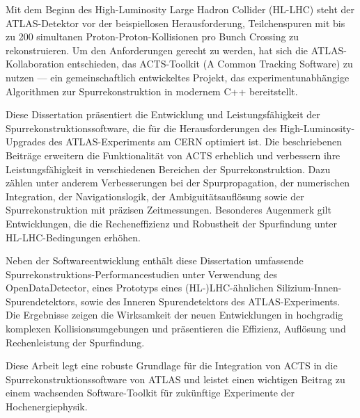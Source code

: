 Mit dem Beginn des High-Luminosity Large Hadron Collider (HL-LHC) steht der ATLAS-Detektor vor der beispiellosen Herausforderung, Teilchenspuren mit bis zu 200 simultanen Proton-Proton-Kollisionen pro Bunch Crossing zu rekonstruieren. Um den Anforderungen gerecht zu werden, hat sich die ATLAS-Kollaboration entschieden, das ACTS-Toolkit (A Common Tracking Software) zu nutzen — ein gemeinschaftlich entwickeltes Projekt, das experimentunabhängige Algorithmen zur Spurrekonstruktion in modernem C++ bereitstellt.

Diese Dissertation präsentiert die Entwicklung und Leistungsfähigkeit der Spurrekonstruktionssoftware, die für die Herausforderungen des High-Luminosity-Upgrades des ATLAS-Experiments am CERN optimiert ist. Die beschriebenen Beiträge erweitern die Funktionalität von ACTS erheblich und verbessern ihre Leistungsfähigkeit in verschiedenen Bereichen der Spurrekonstruktion. Dazu zählen unter anderem Verbesserungen bei der Spurpropagation, der numerischen Integration, der Navigationslogik, der Ambiguitätsauflösung sowie der Spurrekonstruktion mit präzisen Zeitmessungen. Besonderes Augenmerk gilt Entwicklungen, die die Recheneffizienz und Robustheit der Spurfindung unter HL-LHC-Bedingungen erhöhen.

Neben der Softwareentwicklung enthält diese Dissertation umfassende Spurrekonstruktions-Performancestudien unter Verwendung des OpenDataDetector, eines Prototyps eines (HL-)LHC-ähnlichen Silizium-Innen-Spurendetektors, sowie des Inneren Spurendetektors des ATLAS-Experiments. Die Ergebnisse zeigen die Wirksamkeit der neuen Entwicklungen in hochgradig komplexen Kollisionsumgebungen und präsentieren die Effizienz, Auflösung und Rechenleistung der Spurfindung.

Diese Arbeit legt eine robuste Grundlage für die Integration von ACTS in die Spurrekonstruktionssoftware von ATLAS und leistet einen wichtigen Beitrag zu einem wachsenden Software-Toolkit für zukünftige Experimente der Hochenergiephysik.
